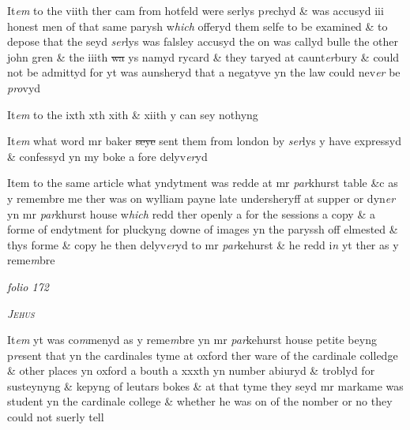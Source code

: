 \documentclass[12pt, a4paper]{book}
\begin{document}
            		
            			
				\marginpar[\vspace{0.5cm}{\textcolor{Gray}{7}}]{}
			
            			
		\ifthenelse{\isodd{\thepage}}
		{\reversemarginpar}
		{\normalmarginpar}
		It\textit{em} to the viith ther cam from hotfeld were serlys p\textit{re}chyd \& was accusyd iii honest men of that same parysh w\textit{hich} offeryd them selfe to be examined \& to depose that the seyd \textit{ser}lys was falsley accusyd the on was callyd bulle the other john gren \& the iiith \sout{wa }ys namyd rycard \& they taryed at caunt\textit{er}bury \& could not be admittyd for yt was  aunsheryd that a negatyve yn the law could nev\textit{er }be \textit{pro}vyd
            		
            		
            			
		\ifthenelse{\isodd{\thepage}}
		{\reversemarginpar}
		{\normalmarginpar}
		It\textit{em} to the ixth xth xith \& xiith y can sey nothyng
            		
            			
		\ifthenelse{\isodd{\thepage}}
		{\reversemarginpar}
		{\normalmarginpar}
		It\textit{em} what word mr baker \sout{seye }sent them from london by \textit{ser}lys y have expressyd \& confessyd yn my boke a fore delyv\textit{er}yd
            		
            			
		\ifthenelse{\isodd{\thepage}}
		{\reversemarginpar}
		{\normalmarginpar}
		Item to the same article what yndytment was redde at mr \textit{par}khurst table \&c as y remembre me ther was on wylliam payne late undersheryff at supper or dyn\textit{er} yn mr \textit{par}khurst house w\textit{hich} redd ther openly a for the sessions a copy \& a  forme of endytment for pluckyng downe of images yn the paryssh off elmested \& thys forme \& copy he then delyv\textit{er}yd to mr \textit{par}kehurst \& he redd i\textit{n} yt ther as y reme\textit{m}bre

\dotfill
					

\textit{folio 172}


               
				\begin{center} \begin{large} {\scshape \textit{Jehus}} \end{large} \end{center}
			
 	

	
		\ifthenelse{\isodd{\thepage}}
		{\reversemarginpar}
		{\normalmarginpar}
		It\textit{em} yt was co\textit{m}menyd as y reme\textit{m}bre yn mr \textit{par}kehurst house petite beyng p\textit{re}sent that yn the cardinales tyme at oxford ther ware of the cardinale colledge \& other places yn oxford a bouth a xxxth yn number abiuryd \& troblyd for susteynyng \& kepyng of leutars bokes \& at that tyme they seyd mr markame was student yn the cardinale college \& whether he was on of the nomber or no they could  not suerly tell 
\end{document}
